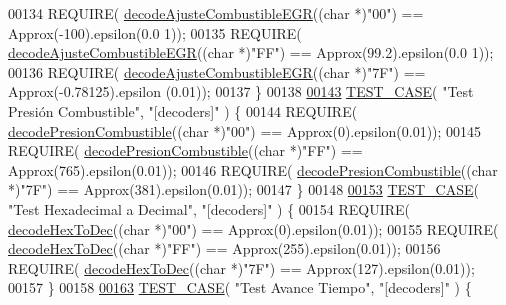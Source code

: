 \begin{DoxyCode}
{00134     REQUIRE( \hyperlink{decoders_8cpp_aeee9e6d8511a934b3a3644b19de3f2b7}{decodeAjusteCombustibleEGR}((\textcolor{keywordtype}{char} *)\textcolor{stringliteral}{"00"}) == Approx(-100).epsilon(0.0
      1));
00135     REQUIRE( \hyperlink{decoders_8cpp_aeee9e6d8511a934b3a3644b19de3f2b7}{decodeAjusteCombustibleEGR}((\textcolor{keywordtype}{char} *)\textcolor{stringliteral}{"FF"}) == Approx(99.2).epsilon(0.0
      1));
00136     REQUIRE( \hyperlink{decoders_8cpp_aeee9e6d8511a934b3a3644b19de3f2b7}{decodeAjusteCombustibleEGR}((\textcolor{keywordtype}{char} *)\textcolor{stringliteral}{"7F"}) == Approx(-0.78125).epsilon
      (0.01));
00137 \}
00138 
\hyperlink{UnitTestCase_8cpp_ae4019c68e76a6f985cf7295357db9853}{00143} \hyperlink{UnitTestCase_8cpp_a094ceea8956a9b495823bde621ea759a}{TEST\_CASE}( \textcolor{stringliteral}{"Test Presión Combustible"}, \textcolor{stringliteral}{"[decoders]"} ) \{
00144     REQUIRE( \hyperlink{decoders_8cpp_ab1c03e72734d4127a1c48f3b5a44a2e2}{decodePresionCombustible}((\textcolor{keywordtype}{char} *)\textcolor{stringliteral}{"00"}) == Approx(0).epsilon(0.01));
00145     REQUIRE( \hyperlink{decoders_8cpp_ab1c03e72734d4127a1c48f3b5a44a2e2}{decodePresionCombustible}((\textcolor{keywordtype}{char} *)\textcolor{stringliteral}{"FF"}) == Approx(765).epsilon(0.01));
00146     REQUIRE( \hyperlink{decoders_8cpp_ab1c03e72734d4127a1c48f3b5a44a2e2}{decodePresionCombustible}((\textcolor{keywordtype}{char} *)\textcolor{stringliteral}{"7F"}) == Approx(381).epsilon(0.01));
00147 \}
00148 
\hyperlink{UnitTestCase_8cpp_a282584e8fd720d07b04a2fd106c9a32c}{00153} \hyperlink{UnitTestCase_8cpp_a094ceea8956a9b495823bde621ea759a}{TEST\_CASE}( \textcolor{stringliteral}{"Test Hexadecimal a Decimal"}, \textcolor{stringliteral}{"[decoders]"} ) \{
00154     REQUIRE( \hyperlink{decoders_8cpp_aa7c5243702d5462e4b638450e750624e}{decodeHexToDec}((\textcolor{keywordtype}{char} *)\textcolor{stringliteral}{"00"}) == Approx(0).epsilon(0.01));
00155     REQUIRE( \hyperlink{decoders_8cpp_aa7c5243702d5462e4b638450e750624e}{decodeHexToDec}((\textcolor{keywordtype}{char} *)\textcolor{stringliteral}{"FF"}) == Approx(255).epsilon(0.01));
00156     REQUIRE( \hyperlink{decoders_8cpp_aa7c5243702d5462e4b638450e750624e}{decodeHexToDec}((\textcolor{keywordtype}{char} *)\textcolor{stringliteral}{"7F"}) == Approx(127).epsilon(0.01));
00157 \}
00158 
\hyperlink{UnitTestCase_8cpp_a8c2e41bed6c672541f7b95ac1edecf0d}{00163} \hyperlink{UnitTestCase_8cpp_a094ceea8956a9b495823bde621ea759a}{TEST\_CASE}( \textcolor{stringliteral}{"Test Avance Tiempo"}, \textcolor{stringliteral}{"[decoders]"} ) \{
}
\end{DoxyCode}
